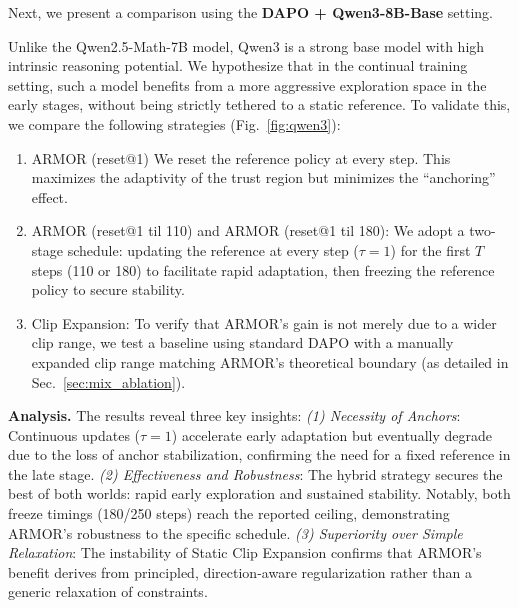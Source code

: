 Next, we present a comparison using the \textbf{DAPO + Qwen3-8B-Base} setting.

Unlike the Qwen2.5-Math-7B model, Qwen3 is a strong base model with high intrinsic reasoning potential.
We hypothesize that in the continual training setting, such a model benefits from a more aggressive exploration space in the early stages, without being strictly tethered to a static reference.
To validate this, we compare the following strategies (Fig.~\ref{fig:qwen3}):

\begin{enumerate}%
    \item \textcolor{myorange}{ARMOR (reset@1)} We reset the reference policy at every step. This maximizes the adaptivity of the trust region but minimizes the ``anchoring'' effect.
    \item \textcolor{mygreen}{ARMOR (reset@1 til 110)} and \textcolor{mypurple}{ARMOR (reset@1 til 180}): We adopt a two-stage schedule: updating the reference at every step ($\tau=1$) for the first $T$ steps (110 or 180) to facilitate rapid adaptation, then freezing the reference policy to secure stability.
    \item \textcolor{mybrown}{Clip Expansion}: To verify that ARMOR's gain is not merely due to a wider clip range, we test a baseline using standard DAPO with a manually expanded clip range matching ARMOR's theoretical boundary (as detailed in Sec.~\ref{sec:mix_ablation}).
\end{enumerate}

\textbf{Analysis.}
The results reveal three key insights:
\textit{(1) Necessity of Anchors}: Continuous updates ($\tau=1$) accelerate early adaptation but eventually degrade due to the loss of anchor stabilization, confirming the need for a fixed reference in the late stage.
\textit{(2) Effectiveness and Robustness}: The hybrid strategy secures the best of both worlds: rapid early exploration and sustained stability. Notably, both freeze timings (180/250 steps) reach the reported ceiling, demonstrating ARMOR's robustness to the specific schedule.
\textit{(3) Superiority over Simple Relaxation}: The instability of Static Clip Expansion confirms that ARMOR's benefit derives from principled, direction-aware regularization rather than a generic relaxation of constraints.


